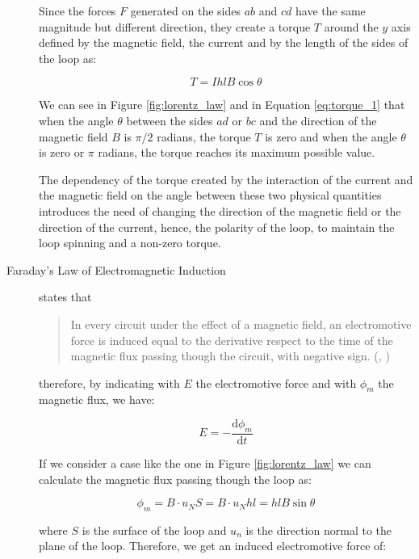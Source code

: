 \begin{description}
Since the forces $F$ generated on the sides $ab$ and $cd$ have the same magnitude but different direction, they create a torque $T$ around the $y$ axis defined by the magnetic field, the current and by the length of the sides of the loop as:

\begin{equation}
	\label{eq:torque_1}
	T = I h l B \cos \theta
\end{equation}

We can see in Figure \ref{fig:lorentz_law} and in Equation \ref{eq:torque_1} that when the angle $\theta$ between the sides $ad$ or $bc$ and the direction of the magnetic field $B$ is $\pi / 2$ radians, the torque $T$ is zero and when the angle $\theta$ is zero or $\pi$ radians, the torque reaches its maximum possible value. 

The dependency of the torque created by the interaction of the current and the magnetic field on the angle between these two physical quantities introduces the need of changing the direction of the magnetic field or the direction of the current, hence, the polarity of the loop, to maintain the loop spinning and a non-zero torque.

\item[Faraday’s Law of Electromagnetic Induction] states that
\blockquote{In every circuit under the effect of a magnetic field, an electromotive force is induced equal to the derivative respect to the time of the magnetic flux passing though the circuit, with negative sign. (\citeauthor{emWaves:1968}, \citeyear{emWaves:1968})}

therefore, by indicating with $E$ the electromotive force and with $\phi _{m}$ the magnetic flux, we have:

\begin{equation}
	\label{eq:em_1}
	E = - \frac{\mathrm{d} \phi _{m}}{\mathrm{d} t}
\end{equation}

If we consider a case like the one in Figure \ref{fig:lorentz_law} we can calculate the magnetic flux passing though the loop as:

\begin{equation}
	\label{eq:mf_1}
	\phi _{m} = B \cdot u_{N} S = B \cdot u_{N} h l = h l B \sin \theta 
\end{equation}

where $S$ is the surface of the loop and $u_{n}$ is the direction normal to the plane of the loop. Therefore, we get an induced electromotive force of:


\end{description}
